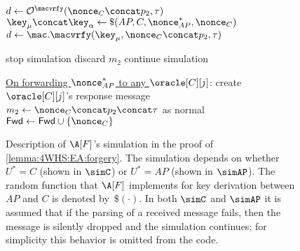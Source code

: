 \begin{figure}
\begin{adjustbox}{margin*=2ex,width=0.997\textwidth,frame,center}
\begin{minipage}[t]{0.5\textwidth}
\begin{algorithmic}[1]
					 \label{code:simAP:line:embed_MAC_oracle:check}
						\State $d \gets \mathcal{O}^{\macvrfy}(\nonce_{C} \concat p_2, \tau)$ \label{code:simAP:line:embed_MAC_oracle}
					\Else
						\State $\key_{\mu} \concat \key_\alpha \gets \$(AP, C, \nonce_{AP}^*, \nonce_{C})$ \label{code:simAP:line:derive_PTK}
						\State $d \gets \mac.\macvrfy(\key_{\mu}, \nonce_{C} \concat p_2, \tau)$ \label{code:simAP:line:local_MAC_check}
					\EndIf
					
					\State
						\State stop simulation \label{code:simAP:line:stop_simulation}
					\Else
						\State discard $m_2$
						\State continue simulation \label{code:simAP:line:m_2_end}
					\EndIf
					
				\EndIndent
				
				\Statex
				
				\setcounter{ALG@line}{399} 
				\State \underline{On forwarding $\nonce_{AP}^*$ to any $\oracle[C][j]$}: \label{code:simAP:line:forward_AP_nonce_start}
				\Indent
					\State create $\oracle[C][j]$'s response message 
					\State $m_2 \gets \nonce_C \concat p_2 \concat \tau$ as normal  
					\State $\mathsf{Fwd} \gets \mathsf{Fwd} \cup \lbrace \nonce_C \rbrace$ \label{code:simAP:line:forward_AP_nonce_end}
				\EndIndent	
		
	
			\end{algorithmic}
	\end{minipage}
	

\end{adjustbox}

\caption{Description of $\A[F]$'s simulation in the proof of \cref{lemma:4WHS:EA:forgery}.
The simulation depends on whether $U^* = C$ (shown in $\simC$) or $U^* = AP$ (shown in $\simAP$).
The random function that $\A[F]$ implements for key derivation between $AP$ and $C$ is denoted by~$\$(\cdot)$.
In both $\simC$ and $\simAP$ it is assumed that if the parsing of a received message fails,
then the message is silently dropped and the simulation continues;
for simplicity this behavior is omitted from the code.}
\label{fig:proof:4WHS-EA:reduction_to_MAC}

\end{figure}